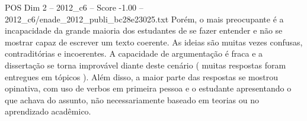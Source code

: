 \begin{textsample}{POS Dim 2 – 2012\_c6 – Score -1.00 – 2012\_c6/enade\_2012\_publi\_bc28e23025.txt}
Porém, o mais preocupante é a incapacidade da grande maioria dos estudantes de se fazer entender e não se mostrar capaz de escrever um texto coerente.
As ideias são muitas vezes confusas, contraditórias e incoerentes.
A capacidade de argumentação é fraca e a dissertação se torna improvável diante deste cenário ( muitas respostas foram entregues em tópicos ).
Além disso, a maior parte das respostas se mostrou opinativa, com uso de verbos em primeira pessoa e o estudante apresentando o que achava do assunto, não necessariamente baseado em teorias ou no aprendizado acadêmico.

\end{textsample}
